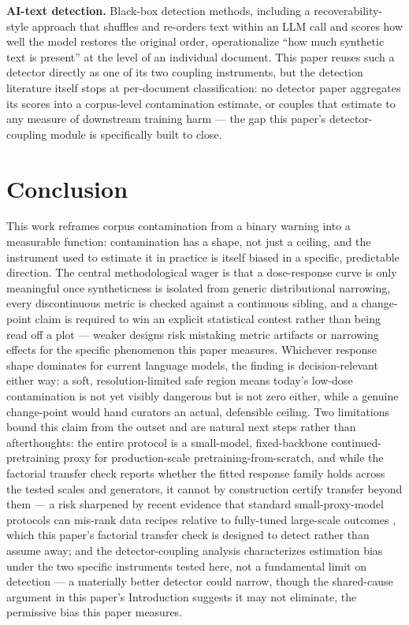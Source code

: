 \documentclass[11pt]{article}
\begin{document}
\textbf{AI-text detection.} Black-box detection methods, including a recoverability-style approach \citep{DandR} that shuffles and re-orders text within an LLM call and scores how well the model restores the original order, operationalize ``how much synthetic text is present'' at the level of an individual document. This paper reuses such a detector directly as one of its two coupling instruments, but the detection literature itself stops at per-document classification: no detector paper aggregates its scores into a corpus-level contamination estimate, or couples that estimate to any measure of downstream training harm --- the gap this paper's detector-coupling module is specifically built to close.

\section{Conclusion}

This work reframes corpus contamination from a binary warning into a measurable function: contamination has a shape, not just a ceiling, and the instrument used to estimate it in practice is itself biased in a specific, predictable direction. The central methodological wager is that a dose-response curve is only meaningful once syntheticness is isolated from generic distributional narrowing, every discontinuous metric is checked against a continuous sibling, and a change-point claim is required to win an explicit statistical contest rather than being read off a plot --- weaker designs risk mistaking metric artifacts or narrowing effects for the specific phenomenon this paper measures. Whichever response shape dominates for current language models, the finding is decision-relevant either way: a soft, resolution-limited safe region means today's low-dose contamination is not yet visibly dangerous but is not zero either, while a genuine change-point would hand curators an actual, defensible ceiling. Two limitations bound this claim from the outset and are natural next steps rather than afterthoughts: the entire protocol is a small-model, fixed-backbone continued-pretraining proxy for production-scale pretraining-from-scratch, and while the factorial transfer check reports whether the fitted response family holds across the tested scales and generators, it cannot by construction certify transfer beyond them --- a risk sharpened by recent evidence that standard small-proxy-model protocols can mis-rank data recipes relative to fully-tuned large-scale outcomes \citep{CanSmallRunsGuideCuration}, which this paper's factorial transfer check is designed to detect rather than assume away; and the detector-coupling analysis characterizes estimation bias under the two specific instruments tested here, not a fundamental limit on detection --- a materially better detector could narrow, though the shared-cause argument in this paper's Introduction suggests it may not eliminate, the permissive bias this paper measures.
\end{document}

